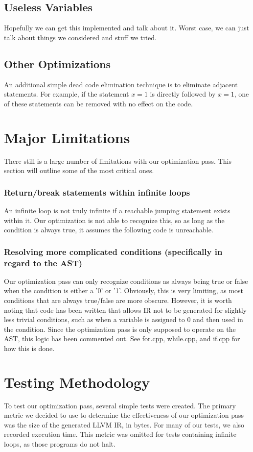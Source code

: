 \documentclass[sigconf]{acmart}
\begin{document}
\subsection{Useless Variables}
Hopefully we can get this implemented and talk about it. Worst case, we can just talk about things we considered 
and stuff we tried.

\subsection{Other Optimizations}
An additional simple dead code elimination technique is to eliminate adjacent statements.
For example, if the statement $x = 1$ is directly followed by $x = 1$, one of these statements can be removed with 
no effect on the code.

\section{Major Limitations}
There still is a large number of limitations with our optimization pass. This section will outline some of the 
most critical ones.

\subsubsection{Return/break statements within infinite loops}
An infinite loop is not truly infinite if a reachable jumping statement exists within it. 
Our optimization is not able to recognize this, so as long as the condition is always true, it assumes 
the following code is unreachable. 

\subsubsection{Resolving more complicated conditions (specifically in regard to the AST)}
Our optimization pass can only recognize conditions as always being true or false when the condition is either a 
'0' or '1'. Obviously, this is very limiting, as most conditions that are always true/false are more obscure. However, it is worth noting that code has been written that allows IR not to be generated for slightly less 
trivial conditions, such as when a variable is assigned to 0 and then used in the condition. 
Since the optimization pass is only supposed to operate on the AST, this logic has been commented out. See for.cpp, while.cpp, and 
if.cpp for how this is done.


\section{Testing Methodology}
To test our optimization pass, several simple tests were created. The primary metric 
we decided to use to determine the effectiveness of our optimization pass was the size of the generated 
LLVM IR, in bytes. For many of our tests, we also recorded execution time. This metric was omitted 
for tests containing infinite loops, as those programs do not halt.
\end{document}

